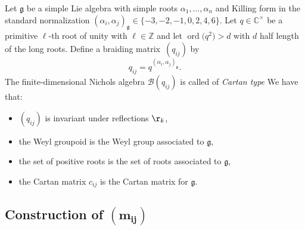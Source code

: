 \documentclass[10pt,a4paper]{amsart}
\numberwithin{equation}{section}
\newcommand{\Z}{\mathbb{Z}}
\newcommand{\C}{\mathbb{C}}
\begin{document}
Let $\mathfrak{g}$ be a simple Lie algebra with simple roots $\alpha_1, \dots, \alpha_n$ and Killing form in the standard normalization $(\alpha_{i}, \alpha_{j})_\mathfrak{g} \in \{-3, -2, -1, 0, 2, 4, 6\}$. Let $q \in \C^\times$ be a primitive $\ell$-th root of unity with $\ell \in \Z$ and let $\operatorname{ord}\big(q^2\big) >d$ with $d$ half length of the long roots. Define a braiding mat\-rix~$(q_{ij})$ by
\[q_{ij} =q^{(\alpha_{i}, \alpha_{j})_\mathfrak{g}}.\]
The finite-dimensional Nichols algebra $\mathcal{B}(q_{ij})$ \cite{AS10, Lusz93, Rosso98} is called of \emph{Cartan type} We have that:
\begin{itemize}\itemsep=0pt
	\item $(q_{ij})$ is invariant under reflections $\r_k$,
	\item the Weyl groupoid is the Weyl group associated to $\mathfrak{g}$,
	\item the set of positive roots is the set of roots associated to $\mathfrak{g}$,
	\item the Cartan matrix $c_{ij}$ is the Cartan matrix for $\mathfrak{g}$.
\end{itemize}

\subsection[Construction of $(m_{ij})$]{Construction of $\boldsymbol{(m_{ij})}$}
\end{document}
